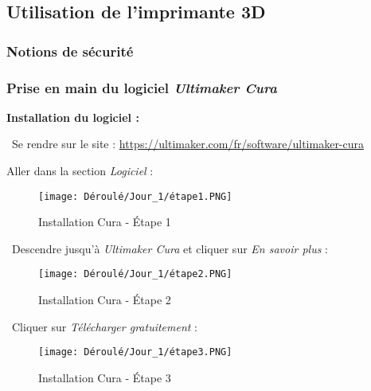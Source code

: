 \newpage

\subsection{Utilisation de l'imprimante 3D}

\subsubsection{Notions de sécurité}



\newpage

\subsubsection{Prise en main du logiciel \textit{Ultimaker Cura}}

\begin{flushleft}
\textbf{Installation du logiciel :}\vskip0.4cm

\textbullet \, Se rendre sur le site : \url{https://ultimaker.com/fr/software/ultimaker-cura}\vspace{0.2cm}

\textbullet \vspace{2mm} Aller dans la section \textit{Logiciel} :
\begin{figure}[!h]
    \centering
    \texttt{[image: Déroulé/Jour\_1/étape1.PNG]}
    \caption{Installation Cura - \'Etape 1}
    \label{fig:my_label}
\end{figure}

\textbullet \, Descendre jusqu'à \textit{Ultimaker Cura} et cliquer sur \textit{En savoir plus} :
\begin{figure}[!h]
    \centering
    \texttt{[image: Déroulé/Jour\_1/étape2.PNG]}
    \caption[\'Etape 2]{Installation Cura - \'Etape 2}
    \label{fig:my_label}
\end{figure}

\newpage

\textbullet \, Cliquer sur \textit{Télécharger gratuitement} :
\begin{figure}[!h]
    \centering
    \texttt{[image: Déroulé/Jour\_1/étape3.PNG]}
    \caption[\'Etape 3]{Installation Cura - \'Etape 3}
    \label{fig:my_label}
\end{figure}
\end{flushleft}

